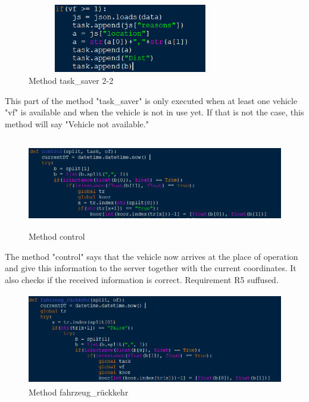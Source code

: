 \documentclass{article}
\begin{document}
\begin{figure}[htp]
    \centering
\includegraphics[width=9cm, height=3cm]{images/Ostrzinski/I8}
   \caption{Method task\_saver 2-2}
    \label{fig:GALAXY}
\end{figure}
\newline
This part of the method "task\_saver" is only executed when at least one vehicle "vf" is available and when the vehicle is not in use yet.
\newline
If that is not the case, this method will say "Vehicle not available."
\newline

\begin{figure}[htp]
    \centering
\includegraphics[width=12cm, height=4cm]{images/Ostrzinski/I9}
   \caption{Method control}
    \label{fig:GALAXY}
\end{figure}
\newline
\newline
The method "control" says that the vehicle now arrives at the place of operation and give this information to the server together with the current coordinates. It also checks if the received information is correct. Requirement R5 suffused.


\begin{figure}[htp]
    \centering
\includegraphics[width=12cm, height=4cm]{images/Ostrzinski/I10}
   \caption{Method fahrzeug\_rückkehr}
    \label{fig:GALAXY}
\end{figure}
\end{document}
